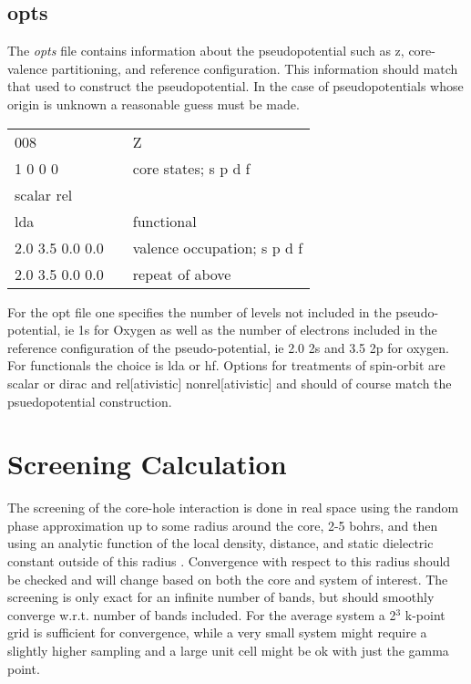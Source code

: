\documentclass[12pt]{article}
\begin{document}
\subsection{opts}
The \emph{opts} file contains information about the pseudopotential such as z, core-valence partitioning, and reference configuration. This information should match that used to construct the pseudopotential. In the case of pseudopotentials 
whose origin is unknown a reasonable guess must be made.

\begin{center}
\begin{tabular}{| l | c l |}
\hline
008				& &  Z\\
1 0 0 0			& & core states; s p d f \\
scalar rel			& & \\
lda				& & functional \\
2.0 3.5 0.0 0.0		& & valence occupation; s p d f \\
2.0 3.5 0.0 0.0		& & repeat of above \\
\hline
\end{tabular}
\end{center}

For the opt file one specifies the number of levels not included in the pseudo-potential, ie 1s for Oxygen as well as the number of electrons included in the reference configuration of the pseudo-potential, ie 2.0 2s and 3.5 2p for oxygen. For functionals the choice is lda or hf. Options for treatments of spin-orbit are 
scalar or dirac and rel[ativistic] nonrel[ativistic] and should of course match the psuedopotential 
construction. 

\section{Screening Calculation}

The screening of the core-hole interaction is done in real space using the random phase approximation up to 
some radius around the core, 2-5 bohrs, and then using an analytic function of the local density, distance, 
and static dielectric constant outside of this radius \cite{screening}. Convergence with respect to this radius should be 
checked and will change based on both the core and system of interest. The screening is only exact for an 
infinite number of bands, but should smoothly converge w.r.t. number of bands included. For the average 
system a 2$^3$ k-point grid is sufficient for convergence, while a very small system might require a 
slightly higher sampling and a large unit cell might be ok with just the gamma point.
\end{document}
